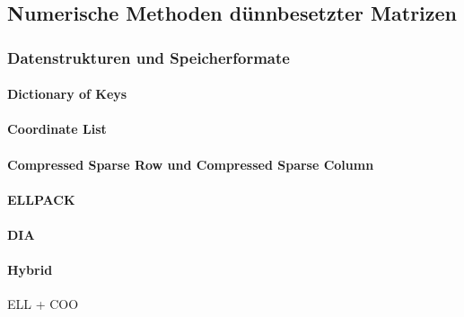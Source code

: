 \documentclass[crop=false]{standalone}
\begin{document}

    \subsection{Numerische Methoden dünnbesetzter Matrizen} %
    \label{sub:sparse_matrix_methoden}
      \subsubsection{Datenstrukturen und Speicherformate} %
      \label{ssub:datenstrukturen_und_speicherformate}
        \cite[S.~78]{Press2002}

        \paragraph{Dictionary of Keys} %
        \label{par:dictionary_of_keys}


        \paragraph{Coordinate List} %
        \label{par:coordinate_list}


        \paragraph{Compressed Sparse Row und Compressed Sparse Column} %
        \label{par:compressed_sparse_row_und_compressed_sparse_column}


        \paragraph{ELLPACK} %
        \label{par:ellpack}


        \paragraph{DIA} %
        \label{par:dia}


        \paragraph{Hybrid} %
        \label{par:hybrid}
          ELL + COO
\end{document}

